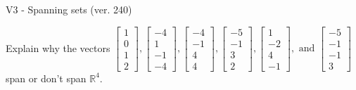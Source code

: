 \begin{exercise}
  \begin{exerciseTitle}V3 - Spanning sets (ver. 240)\end{exerciseTitle}
  \begin{exerciseStatement}
    Explain why the vectors \(\left[\begin{array}{r}
1 \\
0 \\
1 \\
2
\end{array}\right] , \left[\begin{array}{r}
-4 \\
1 \\
-1 \\
-4
\end{array}\right] , \left[\begin{array}{r}
-4 \\
-1 \\
4 \\
4
\end{array}\right] , \left[\begin{array}{r}
-5 \\
-1 \\
3 \\
2
\end{array}\right] , \left[\begin{array}{r}
1 \\
-2 \\
4 \\
-1
\end{array}\right] , \text{ and } \left[\begin{array}{r}
-5 \\
-1 \\
-1 \\
3
\end{array}\right]\) span or don't span \(\mathbb{R}^4\). 
	



\end{exerciseStatement}
\end{exercise}
